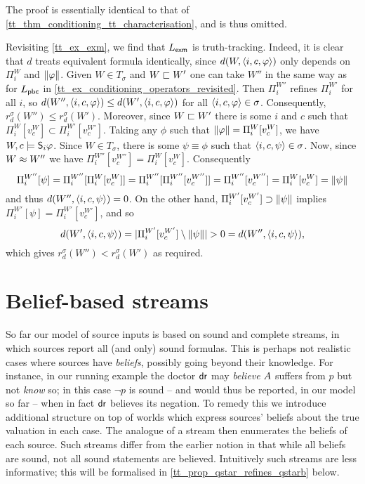 The proof is essentially identical to that of
\cref{tt_thm_conditioning_tt_characterisation}, and is thus omitted.

\begin{example}
    \label{tt_ex_exm_truth_tracking}
    Revisiting \cref{tt_ex_exm}, we find that $L_\exm$ is truth-tracking.
    Indeed, it is clear that $d$ treats equivalent formula identically, since
    $d(W, \tuple{i, c, \phi})$ only depends on $\Pi^W_i$ and $\propmods{\phi}$.
    Given $W \in T_\sigma$ and $W \speclt W'$ one can take $W''$ in the
    same way as for $L_\pbc$ in
    \cref{tt_ex_conditioning_operators_revisited}. Then $\Pi^{W''}_i$ refines
    $\Pi^{W'}_i$ for all $i$, so $d(W'', \tuple{i, c, \phi}) \le d(W',
    \tuple{i, c, \phi})$ for all $\tuple{i, c, \phi} \in \sigma$. Consequently,
    $r_d^\sigma(W'') \le r_d^\sigma(W')$. Moreover, since $W \speclt W'$
    there is some $i$ and $c$ such that $\Pi^{W}_i[v^{W}_c]
    \subset \Pi^{W'}_i[v^{W'}_c]$. Taking any $\phi$ such that $\propmods{\phi}
    = \Pi^{W}_i[v^{W}_c]$, we have $W, c \models \S_i\phi$. Since $W \in
    T_\sigma$, there is some $\psi \equiv \phi$ such that $\tuple{i, c, \psi}
    \in \sigma$. Now, since $W \speceq W''$ we have $\Pi^{W''}_i[v^{W''}_c] =
    \Pi^{W}_i[v^W_c]$. Consequently
    \[
        \Pi^{W''}_i[\psi]
        = \Pi^{W''}_i[\Pi^W_i[v^W_c]]
        = \Pi^{W''}_i[\Pi^{W''}_i[v^{W''}_c]]
        = \Pi^{W''}_i[v^{W''}_c]
        = \Pi^W_i[v^W_c]
        = \propmods{\psi}
    \]
    and thus $d(W'', \tuple{i, c, \psi})= 0$. On the other hand,
    $\Pi^{W'}_i[v^{W'}_c] \supset \propmods{\psi}$ implies $\Pi^{W'}_i[\psi] =
    \Pi^{W'}_i[v^{W'}_c]$, and so
    \[
        d(W', \tuple{i, c, \psi})
        = |\Pi^{W'}_i[v^{W'}_c] \setminus \propmods{\psi}|
        > 0 = d(W'', \tuple{i, c, \psi}),
    \]
    which gives $r_d^\sigma(W'') < r_d^\sigma(W')$ as required.
\end{example}

\section{Belief-based streams}
\label{tt_sec_belief_based_streams}

So far our model of source inputs is based on sound and complete streams, in
which sources report all (and only) sound formulas. This is perhaps not
realistic cases where sources have \emph{beliefs}, possibly going beyond their
knowledge.  For instance, in our running example the doctor $\dr$ may
\emph{believe} $\patientA$ suffers from $p$ but not \emph{know} so; in this
case $\neg{p}$ is sound -- and would thus be reported, in our model so far --
when in fact $\dr$ believes its negation. To remedy this we introduce
additional structure on top of worlds which express sources' beliefs about the
true valuation in each case. The analogue of a stream then enumerates the
beliefs of each source. Such streams differ from the earlier notion in that
while all beliefs are sound, not all sound statements are believed. Intuitively
such streams are less informative; this will be formalised in
\cref{tt_prop_qstar_refines_qstarb} below.

